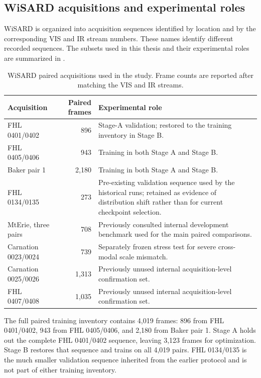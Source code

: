 \subsection{WiSARD acquisitions and experimental roles}

WiSARD is organized into acquisition sequences identified by location and by
the corresponding VIS and IR stream numbers. These names identify different
recorded sequences. The subsets used in this thesis and their experimental
roles are summarized in .

\begin{table}[htbp]
  \centering
  \caption{WiSARD paired acquisitions used in the study. Frame counts are
  reported after matching the VIS and IR streams.}
  \label{tab:wisard-acquisitions}
  \begin{tabularx}{\textwidth}{@{}l r X@{}}
    \toprule
    Acquisition & Paired frames & Experimental role \\
    \midrule
    FHL 0401/0402 & 896
      & Stage-A validation; restored to the training inventory in Stage B. \\
    FHL 0405/0406 & 943
      & Training in both Stage A and Stage B. \\
    Baker pair 1 & 2,180
      & Training in both Stage A and Stage B. \\
    FHL 0134/0135 & 273
      & Pre-existing validation sequence used by the historical runs; retained
        as evidence of distribution shift rather than for current checkpoint selection. \\
    MtErie, three pairs & 708
      & Previously consulted internal development benchmark used for the main
        paired comparisons. \\
    Carnation 0023/0024 & 739
      & Separately frozen stress test for severe cross-modal scale mismatch. \\
    Carnation 0025/0026 & 1,313
      & Previously unused internal acquisition-level confirmation set. \\
    FHL 0407/0408 & 1,035
      & Previously unused internal acquisition-level confirmation set. \\
    \bottomrule
  \end{tabularx}
\end{table}

The full paired training inventory contains 4,019 frames: 896 from FHL
0401/0402, 943 from FHL 0405/0406, and 2,180 from Baker pair 1. Stage A holds
out the complete FHL 0401/0402 sequence, leaving 3,123 frames for optimization.
Stage B restores that sequence and trains on all 4,019 pairs. FHL 0134/0135 is
the much smaller validation sequence inherited from the earlier protocol and
is not part of either training inventory.

